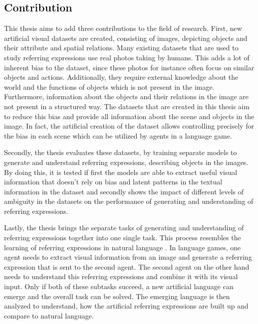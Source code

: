 \subsection{Contribution}
This thesis aims to add three contributions to the field of research.
First, new artificial visual datasets are created, consisting of images, depicting objects and their attribute and spatial relations.
Many existing datasets that are used to study referring expressions use real photos taking by humans.
This adds a lot of inherent bias to the dataset, since these photos for instance often focus on similar objects and actions.
Additionally, they require external knowledge about the world and the functions of objects which is not present in the image.
Furthermore, information about the objects and their relations in the image are not present in a structured way.
The datasets that are created in this thesis aim to reduce this bias and provide all information about the scene and objects in the image.
In fact, the artificial creation of the dataset allows controlling precisely for the bias in each scene which can be utilized by agents in a language game.

Secondly, the thesis evaluates these datasets, by training separate models to generate and understand referring expressions, describing objects in the images.
By doing this, it is tested if first the models are able to extract useful visual information that doesn't rely on bias and latent patterns in the textual information in the dataset and secondly shows the impact of different levels of ambiguity in the datasets on the performance of generating and understanding of referring expressions.

Lastly, the thesis brings the separate tasks of generating and understanding of referring expressions together into one single task.
This process resembles the learning of referring expressions in natural language \citep{Clark1986}.
In language games, one agent needs to extract visual information from an image and generate a referring expression that is sent to the second agent.
The second agent on the other hand needs to understand this referring expressions and combine it with its visual input.
Only if both of these subtasks succeed, a new artificial language can emerge and the overall task can be solved.
The emerging language is then analyzed to understand, how the artificial referring expressions are built up and compare to natural language.

